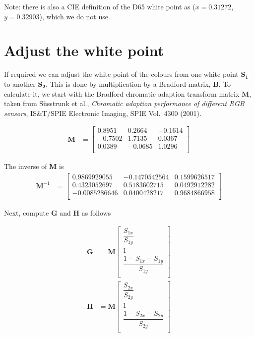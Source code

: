\documentclass{article}
\begin{document}
Note: there is also a CIE definition of the D65 white point as ($x =
0.31272$, $y = 0.32903$), which we do not use.


\section{Adjust the white point}

If required we can adjust the white point of the colours from one
white point $\mathbf{S_1}$ to another $\mathbf{S_2}$.  This is done by multiplication by
a Bradford matrix, $\mathbf{B}$.  To calculate it, we start with the
Bradford chromatic adaption transform matrix $\mathbf{M}$, taken from
S\"usstrunk et al., \textit{Chromatic adaption performance of
  different RGB sensors}, IS&T/SPIE Electronic Imaging, SPIE
Vol.\ 4300 (2001).

\begin{align}
\mathbf{M} &= \left[\begin{matrix}
0.8951 & 0.2664 & -0.1614 \\
-0.7502 & 1.7135 & 0.0367 \\
0.0389 & -0.0685 & 1.0296 \\
\end{matrix}\right]
\end{align}

The inverse of $\mathbf{M}$ is
\begin{align}
\mathbf{M}^{-1} &= \left[\begin{matrix}
0.9869929055 & -0.1470542564 & 0.1599626517 \\
0.4323052697 & 0.5183602715 & 0.0492912282 \\
-0.0085286646 & 0.0400428217 & 0.9684866958 \\
\end{matrix}\right]
\end{align}

Next, compute $\mathbf{G}$ and $\mathbf{H}$ as follows

\begin{align}
\mathbf{G} &= \mathbf{M} \left[\begin{matrix} \dfrac{S_{1x}}{S_{1y}} \\[2ex] 1 \\ \dfrac{1 - S_{1x} - S_{1y}}{S_{1y}} \\[2ex] \end{matrix}\right] \\
\mathbf{H} &= \mathbf{M} \left[\begin{matrix} \dfrac{S_{2x}}{S_{2y}} \\[2ex] 1 \\ \dfrac{1 - S_{2x} - S_{2y}}{S_{2y}} \\[2ex] \end{matrix}\right]
\end{align}
\end{document}
